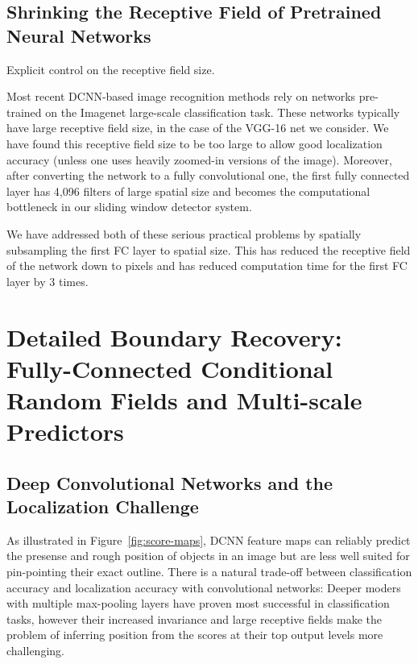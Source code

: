 \subsection{Shrinking the Receptive Field of Pretrained Neural Networks}
\label{sec:convnet-field}

Explicit control on the receptive field size.

Most recent DCNN-based image recognition methods rely on networks pre-trained
on the Imagenet large-scale classification task. These networks typically have
large receptive field size,  in the case of the VGG-16 net we
consider. We have found this receptive field size to be too large to allow
good localization accuracy (unless one uses heavily zoomed-in versions of the
image). Moreover, after converting the network to a fully convolutional one,
the first fully connected layer has 4,096 filters of large  spatial
size and becomes the computational bottleneck in our sliding window detector
system.

We have addressed both of these serious practical problems by spatially
subsampling the first FC layer to  spatial size. This has reduced the
receptive field of the network down to  pixels and has reduced
computation time for the first FC layer by 3 times.


\section{Detailed Boundary Recovery: Fully-Connected Conditional Random Fields
  and Multi-scale Predictors}
\label{sec:boundary-recovery}

\subsection{Deep Convolutional Networks and the Localization Challenge}
\label{sec:local-chal}

As illustrated in Figure~\ref{fig:score-maps}, DCNN feature maps can
reliably predict the presense and rough position of objects in an image but
are less well suited for pin-pointing their exact outline. There is a natural
trade-off between classification accuracy and localization accuracy with
convolutional networks: Deeper moders with multiple max-pooling layers have
proven most successful in classification tasks, however their increased
invariance and large receptive fields make the problem of inferring position
from the scores at their top output levels more challenging.


